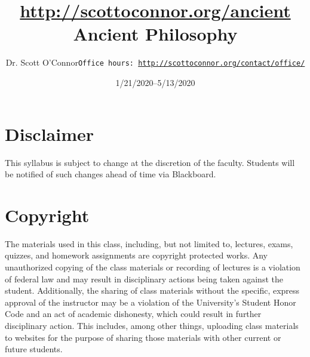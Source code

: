 \documentclass[article,oneside]{memoir}
\def\myauthor{Author}
\def\mytitle{Title}
\def\mycopyright{\myauthor}
\def\myweb{\href{http://scottoconnor.org/ancient}{http://scottoconnor.org/ancient}}
\def\myauthor{Dr. Scott O'Connor}
\def\mytitle{{\normalsize \myweb \newline} \HUGE Ancient Philosophy}
\begin{document}
\setsansfont[Mapping=tex-text]{Myriad Pro} 
\setmonofont[Mapping=tex-text,Scale=0.8]{Georgia} 

\def\ind{\hangindent=1 true cm\hangafter=1 \noindent}
\def\labelitemi{$\cdot$}


\title{\LARGE \mytitle}     
\author{\Large\myauthor \newline \footnotesize\texttt{\noindent Office hours: \href{http://scottoconnor.org/contact/office/}{http://scottoconnor.org/contact/office/}}}
\date{1/21/2020--5/13/2020}


\maketitle




%
%


\section{Disclaimer}
 This syllabus is subject to change at the discretion of the faculty. Students will be notified of such changes ahead of time via Blackboard. 


\section{Copyright}
The materials used in this class, including, but not limited to, lectures, exams, quizzes, and homework assignments are copyright protected works.  Any unauthorized copying of the class materials or recording of lectures is a violation of federal law and may result in disciplinary actions being taken against the student.  Additionally, the sharing of class materials without the specific, express approval of the instructor may be a violation of the University's Student Honor Code and an act of academic dishonesty, which could result in further disciplinary action.  This includes, among other things, uploading class materials to websites for the purpose of sharing those materials with other current or future students. 
\end{document}
